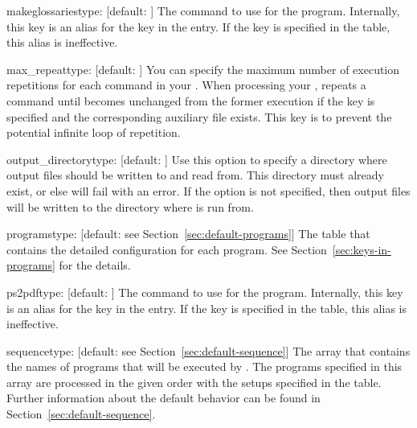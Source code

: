 \documentclass{llmk-doc}
\begin{document}
\begin{confkey}{makeglossaries}{type: }[default: ]
The command to use for the  program. Internally, this key
is an alias for the  key in the  entry. If
the  key is specified in the  table, this alias is
ineffective.
\end{confkey}

\begin{confkey}{max\_repeat}{type: }[default: ]
You can specify the maximum number of execution repetitions for each command in
your . When processing your ,  repeats
a command until  becomes unchanged from the former execution if
the key is specified and the corresponding auxiliary file exists. This key is to
prevent the potential infinite loop of repetition.
\end{confkey}

\begin{confkey}{output\_directory}{type: }[default: ]
Use this option to specify a directory where  output files should be written to and read from. This directory must already exist, or else  will fail with an error. If the option is not specified, then output files will be written to the directory where  is run from.
\end{confkey}

\begin{confkey}{programs}{type: }
  [default: see Section~\ref{sec:default-programs}]
The table that contains the detailed configuration for each program. See
Section~\ref{sec:keys-in-programs} for the details.
\end{confkey}

\begin{confkey}{ps2pdf}{type: }[default: ]
The command to use for the  program. Internally, this key is
an alias for the  key in the  entry. If the
 key is specified in the  table, this alias is
ineffective.
\end{confkey}

\begin{confkey}{sequence}{type: }
  [default: see Section~\ref{sec:default-sequence}]
The array that contains the names of programs that will be executed by
. The programs specified in this array are processed in the given
order with the setups specified in the  table. Further
information about the default behavior can be found in
Section~\ref{sec:default-sequence}.
\end{confkey}
\end{document}
